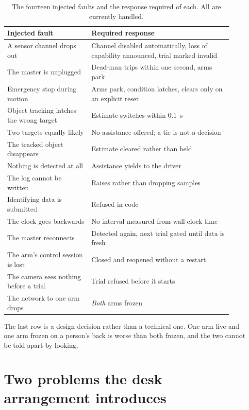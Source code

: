 \begin{table}[htbp]
  \centering
  \small
  \caption[Fault injection]{The fourteen injected faults and the response
  required of each. All are currently handled.}
  \label{tab:faults}
  \begin{tabular}{@{}p{0.34\linewidth}p{0.58\linewidth}@{}}
    \toprule
    \textbf{Injected fault} & \textbf{Required response} \\
    \midrule
    A sensor channel drops out & Channel disabled automatically, loss of
      capability announced, trial marked invalid \\
    The master is unplugged & Dead-man trips within one second, arms park \\
    Emergency stop during motion & Arms park, condition latches, clears only
      on an explicit reset \\
    Object tracking latches the wrong target & Estimate switches within
      \SI{0.1}{\second} \\
    Two targets equally likely & No assistance offered; a tie is not a
      decision \\
    The tracked object disappears & Estimate cleared rather than held \\
    Nothing is detected at all & Assistance yields to the driver \\
    The log cannot be written & Raises rather than dropping samples \\
    Identifying data is submitted & Refused in code \\
    The clock goes backwards & No interval measured from wall-clock time \\
    The master reconnects & Detected again, next trial gated until data is
      fresh \\
    The arm's control session is lost & Closed and reopened without a restart \\
    The camera sees nothing before a trial & Trial refused before it starts \\
    The network to one arm drops & \emph{Both} arms frozen \\
    \bottomrule
  \end{tabular}
\end{table}

The last row is a design decision rather than a technical one. One arm live
and one arm frozen on a person's back is worse than both frozen, and the two
cannot be told apart by looking.

\section{Two problems the desk arrangement introduces}
\label{sec:tracking}


